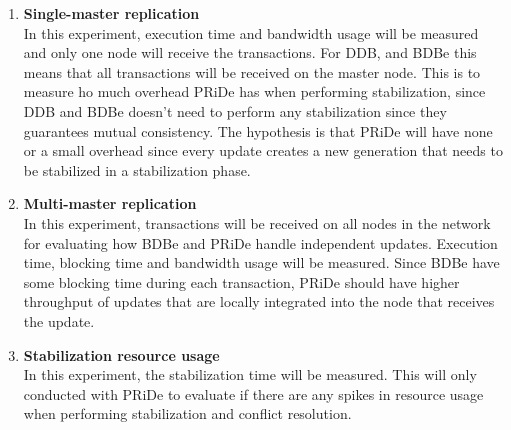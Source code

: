 \begin{enumerate}

	\item \textbf{Single-master replication} \\ In this experiment, execution time and bandwidth usage will be measured and only one node will receive the transactions. For DDB, and BDBe this means that all transactions will be received on the master node. This is to measure ho much overhead PRiDe has when performing stabilization, since DDB and BDBe doesn't need to perform any stabilization since they guarantees mutual consistency. The hypothesis is that PRiDe will have none or a small overhead since every update creates a new generation that needs to be stabilized in a stabilization phase.
	
	\item \textbf{Multi-master replication} \\ In this experiment, transactions will be received on all nodes in the network for evaluating how BDBe and PRiDe handle independent updates. Execution time, blocking time and bandwidth usage will be measured. Since BDBe have some blocking time during each transaction, PRiDe should have higher throughput of updates that are locally integrated into the node that receives the update.  
	
	   
	\item \textbf{Stabilization resource usage} \\ In this experiment, the stabilization time will be measured. This will only conducted with PRiDe to evaluate if there are any spikes in resource usage when performing stabilization and conflict resolution.
	
	 
\end{enumerate}

